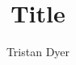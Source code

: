 \documentclass[draft]{article}
\begin{document}
\title{Title}
\author{Tristan Dyer}
\maketitle

\lipsum[1]
\end{document}
